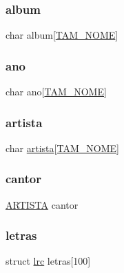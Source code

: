\subsubsection{\texorpdfstring{album}{album}}
{\footnotesize\ttfamily char album\mbox{[}\mbox{\hyperlink{project_8h_ad0e480e07eae04b077948c75deb75422}{T\+A\+M\+\_\+\+N\+O\+ME}}\mbox{]}}

\mbox{\label{structmusica_a425a18cdc020d8ccc82c46c220d521f9}} 
\subsubsection{\texorpdfstring{ano}{ano}}
{\footnotesize\ttfamily char ano\mbox{[}\mbox{\hyperlink{project_8h_ad0e480e07eae04b077948c75deb75422}{T\+A\+M\+\_\+\+N\+O\+ME}}\mbox{]}}

\mbox{\label{structmusica_a3ece80975d3e1263d85091ba633e7690}} 
\subsubsection{\texorpdfstring{artista}{artista}}
{\footnotesize\ttfamily char \mbox{\hyperlink{structartista}{artista}}\mbox{[}\mbox{\hyperlink{project_8h_ad0e480e07eae04b077948c75deb75422}{T\+A\+M\+\_\+\+N\+O\+ME}}\mbox{]}}

\mbox{\label{structmusica_a8b6fc763fbedbcbdf1ed51a276b15e9b}} 
\subsubsection{\texorpdfstring{cantor}{cantor}}
{\footnotesize\ttfamily \mbox{\hyperlink{project_8h_a8f88f8ad560381cf6e92b1ff3ca5efb2}{A\+R\+T\+I\+S\+TA}} cantor}

\mbox{\label{structmusica_a5243e7f8641c5be23da1e7391c8fc4d6}} 
\subsubsection{\texorpdfstring{letras}{letras}}
{\footnotesize\ttfamily struct \mbox{\hyperlink{structlrc}{lrc}} letras\mbox{[}100\mbox{]}}

